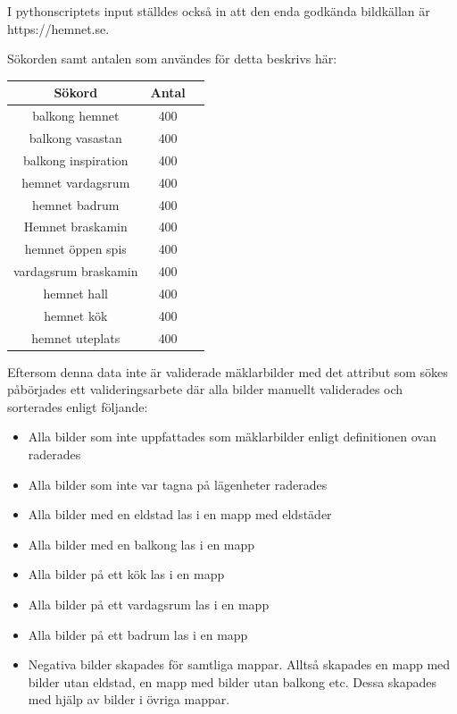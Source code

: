 \documentclass{kththesis}
\begin{document}
I pythonscriptets input ställdes också in att den enda godkända bildkällan är https://hemnet.se.

Sökorden samt antalen som användes för detta beskrivs här:

\begin{center}
  \begin{tabular}{ |c|c|c| } 
   \hline
   Sökord & Antal \\ 
   \hline
   balkong hemnet & 400  \\ 
   \hline
   balkong vasastan & 400 \\ 
   \hline
   balkong inspiration & 400 \\ 
   \hline
   hemnet vardagsrum & 400  \\ 
   \hline
   hemnet badrum & 400 \\ 
   \hline

   Hemnet braskamin & 400  \\ 

   \hline
   hemnet öppen spis & 400 \\ 
   \hline
   vardagsrum braskamin & 400 \\ 
   
   \hline
   hemnet hall & 400 \\ 
   \hline
   hemnet kök & 400 \\ 
   \hline
   hemnet uteplats & 400   \\ 
   \hline 
  \end{tabular}
  \end{center}

Eftersom denna data inte är validerade mäklarbilder med det attribut som sökes påbörjades ett valideringsarbete där alla bilder manuellt validerades och sorterades enligt följande:
\begin{itemize}
  \item Alla bilder som inte uppfattades som mäklarbilder enligt definitionen ovan raderades
  \item Alla bilder som inte var tagna på lägenheter raderades
  \item Alla bilder med en eldstad las i en mapp med eldstäder
  \item Alla bilder med en balkong las i en mapp
  \item Alla bilder på ett kök las i en mapp
  \item Alla bilder på ett vardagsrum las i en mapp
  \item Alla bilder på ett badrum las i en mapp
  \item Negativa bilder skapades för samtliga mappar. Alltså skapades en mapp med bilder utan eldstad, en mapp med bilder utan balkong etc. Dessa skapades med hjälp av bilder i övriga mappar. 
\end{itemize} 
\end{document}
